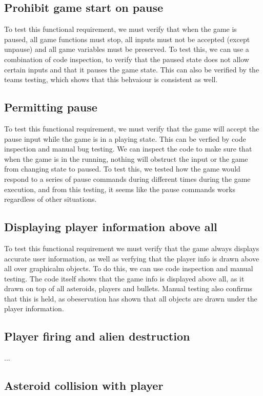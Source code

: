 \documentclass[12pt, titlepage]{article}
\begin{document}
\subsection{Prohibit game start on pause}
To test this functional requirement, we must verify that when the game is paused, all game functions must stop, all inputs must not be accepted (except unpause) and all game variables must be preserved. To test this, we can use a combination of code inspection, to verify that the paused state does not allow certain inputs and that it pauses the game state. This can also be verified by the teams testing, which shows that this behvaiour is consistent as well.
\subsection{Permitting pause}
To test this functional requirement, we must verify that the game will accept the pause input while the game is in a playing state. This can be verfied by code inspection and manual bug testing. We can inspect the code to make sure that when the game is in the running, nothing will obstruct the input or the game from changing state to paused. To test this, we tested how the game would respond to a series of pause commands during different times during the game execution, and from this testing, it seems like the pause commands works regardless of other situations.
\subsection{Displaying player information above all}
To test this functional requirement we must verify that the game always displays accurate user information, as well as verfying that the player info is drawn above all over graphicalm objects. To do this, we can use code inspection and manual testing. The code itself shows that the game info is displayed above all, as it drawn on top of all asteroids, players and bullets. Manual testing also confirms that this is held, as obeservation has shown that all objects are drawn under the player information.
\subsection{Player firing and alien destruction}
...\\
\subsection{Asteroid collision with player}
\end{document}
